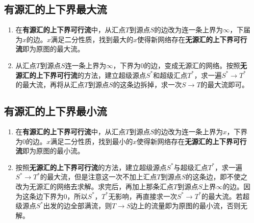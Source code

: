 \subsection{有源汇的上下界最大流}
\begin{enumerate}
	\item 在\textbf{有源汇的上下界可行流}中，从汇点$T$到源点$S$的边改为连一条上界为$\infty$，下届为$x$的边。$x$满足二分性质，找到最大的$x$使得新网络存在\textbf{无源汇的上下界可行流}即为原图的最大流。
	\item 从汇点$T$到源点$S$连一条上界为$\infty$，下界为$0$的边，变成无源汇的网络。按照\textbf{无源汇的上下界可行流}的方法，建立超级源点$S^*$和超级汇点$T^*$，求一遍$S^* \rightarrow T^*$的最大流，再将从汇点$T$到源点$S$的这条边拆掉，求一次$S \rightarrow T$的最大流即可。
\end{enumerate}
\subsection{有源汇的上下界最小流}
\begin{enumerate}
	\item 在\textbf{有源汇的上下界可行流}中，从汇点$T$到源点$S$的边改为连一条上界为$x$，下界为$0$的边。$x$满足二分性质，找到最小的$x$使得新网络存在\textbf{无源汇的上下界可行流}即为原图的最小流。
	\item 按照\textbf{无源汇的上下界可行流}的方法，建立超级源点$S^*$与超级汇点$T^*$，求一遍$S^* \rightarrow T^*$的最大流，但是注意这一次不加上汇点$T$到源点$S$的这条边，即不使之改为无源汇的网络去求解。求完后，再加上那条汇点$T$到源点$S$上界$\infty$的边。因为这条边下界为$0$，所以$S^*$，$T^*$无影响，再直接求一次$S^* \rightarrow T^*$的最大流。若超级源点$S^*$出发的边全部满流，则$T \rightarrow S$边上的流量即为原图的最小流，否则无解。
\end{enumerate}

